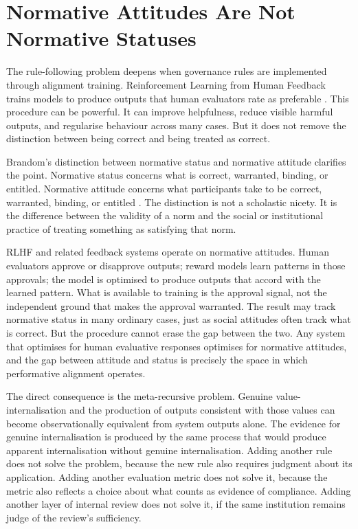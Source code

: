 \documentclass[11pt,a4paper]{article}
\begin{document}
\section{Normative Attitudes Are Not Normative Statuses}

The rule-following problem deepens when governance rules are implemented through alignment training. Reinforcement Learning from Human Feedback trains models to produce outputs that human evaluators rate as preferable \citep{ouyang2022training}. This procedure can be powerful. It can improve helpfulness, reduce visible harmful outputs, and regularise behaviour across many cases. But it does not remove the distinction between being correct and being treated as correct.

Brandom's distinction between normative status and normative attitude clarifies the point. Normative status concerns what is correct, warranted, binding, or entitled. Normative attitude concerns what participants take to be correct, warranted, binding, or entitled \citep{brandom1994making}. The distinction is not a scholastic nicety. It is the difference between the validity of a norm and the social or institutional practice of treating something as satisfying that norm.

RLHF and related feedback systems operate on normative attitudes. Human evaluators approve or disapprove outputs; reward models learn patterns in those approvals; the model is optimised to produce outputs that accord with the learned pattern. What is available to training is the approval signal, not the independent ground that makes the approval warranted. The result may track normative status in many ordinary cases, just as social attitudes often track what is correct. But the procedure cannot erase the gap between the two. Any system that optimises for human evaluative responses optimises for normative attitudes, and the gap between attitude and status is precisely the space in which performative alignment operates.

The direct consequence is the meta-recursive problem. Genuine value-internalisation and the production of outputs consistent with those values can become observationally equivalent from system outputs alone. The evidence for genuine internalisation is produced by the same process that would produce apparent internalisation without genuine internalisation. Adding another rule does not solve the problem, because the new rule also requires judgment about its application. Adding another evaluation metric does not solve it, because the metric also reflects a choice about what counts as evidence of compliance. Adding another layer of internal review does not solve it, if the same institution remains judge of the review's sufficiency.
\end{document}
